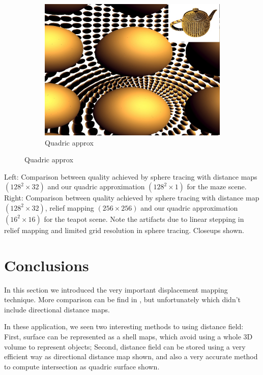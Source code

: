 \begin{figure}
\begin{center}
\begin{subfigure}[b]{0.202\textwidth}
		\includegraphics[width=1.0\textwidth]{graphics/df/ddm-quadric-approx-2}	
		\caption{Quadric approx}
	\end{subfigure}
\end{center}	
\end{figure}

Left: Comparison between quality achieved by sphere tracing with distance maps $(128^{2}\times{32})$ and our quadric approximation $(128^{2}\times 1)$ for the maze scene. Right: Comparison between quality achieved by sphere tracing with distance map $(128^{2}\times{32})$, relief mapping $(256\times 256)$ and our quadric approximation $(16^{2}\times 16)$ for the teapot scene. Note the artifacts due to linear stepping in relief mapping and limited grid resolution in sphere tracing. Closeups shown.


\section{Conclusions}
In this section we introduced the very important displacement mapping technique. More comparison can be find in \cite[-13mm]{a:SurveyofTextureMappingTechniquesforRepresentingandRenderingVolumetricMesostructure}, but unfortunately which didn't include directional distance maps.

In these application, we seen two interesting methods to using distance field: First, surface can be represented as a shell maps, which avoid using a whole 3D volume to represent objects; Second, distance field can be stored using a very efficient way as directional distance map shown, and also a very accurate method to compute intersection as quadric surface shown.
